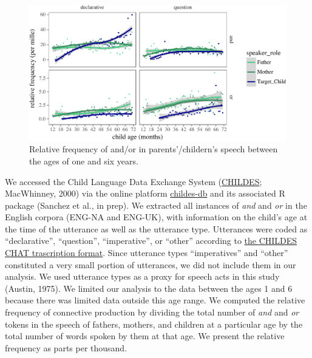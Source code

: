 \documentclass[10pt, letterpaper]{article}
\newenvironment{CodeChunk}{}{}
\begin{document}
\begin{CodeChunk}
\begin{figure}[t]

{\centering \includegraphics{figs/byspeechActPlots-1} 

}

\caption[Relative frequency of and/or in parents'/childern's speech between the ages of one and six years]{Relative frequency of and/or in parents'/childern's speech between the ages of one and six years.}\label{fig:byspeechActPlots}
\end{figure}
\end{CodeChunk}

We accessed the Child Language Data Exchange System
(\href{https://childes.talkbank.org/}{CHILDES}; MacWhinney, 2000) via
the online platform \href{http://childes-db.stanford.edu/}{childes-db}
and its associated R package (Sanchez et al., in prep). We extracted all
instances of \emph{and} and \emph{or} in the English corpora (ENG-NA and
ENG-UK), with information on the child's age at the time of the
utterance as well as the utterance type. Utterances were coded as
``declarative'', ``question'', ``imperative'', or ``other'' according to
\href{https://talkbank.org/manuals/CHAT.html\#_Toc486414422}{the CHILDES
CHAT trascription format}. Since utterance types ``imperatives'' and
``other'' constituted a very small portion of utterances, we did not
include them in our analysis. We used utterance types as a proxy for
speech acts in this study (Austin, 1975). We limited our analysis to the
data between the ages 1 and 6 because there was limited data outside
this age range. We computed the relative frequency of connective
production by dividing the total number of \emph{and} and \emph{or}
tokens in the speech of fathers, mothers, and children at a particular
age by the total number of words spoken by them at that age. We present
the relative frequency as parts per thousand.
\end{document}
